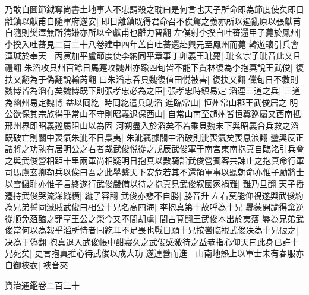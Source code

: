 乃敢自圖節鉞奪尚書土地事人不忠請殺之耽曰是何言也天子所命即為節度使矣即日離鎮以獻甫自隨軍府遂安|{
	即日離鎮既得君命召不俟駕之義亦所以遏亂原以張獻甫自隨則樊澤無所猜嫌亦所以全獻甫也離力智翻}
左僕射李揆自吐蕃還甲子薨於鳳州|{
	李揆入吐蕃見二百二十八卷建中四年盖自吐蕃還赴興元至鳳州而薨}
韓遊瓌引兵會渾瑊於奉天　丙寅加平盧節度使李納同平章事丁卯義王玼薨|{
	玼玄宗子玼音此又且禮翻}
朱滔攻貝州百餘日馬寔攻魏州亦踰四旬皆不能下賈林復為李抱真說王武俊|{
	復扶又翻為于偽翻說輸芮翻}
曰朱滔志呑貝魏復值田悦被害|{
	復抉又翻}
儻旬日不救則魏博皆為滔有矣魏博既下則張孝忠必為之臣|{
	張孝忠時鎮易定}
滔連三道之兵|{
	三道為幽州易定魏博}
益以囘紇|{
	時囘紇遣兵助滔}
進臨常山|{
	恒州常山郡王武俊居之}
明公欲保其宗族得乎常山不守則昭義退保西山|{
	自常山南至趙州皆恒冀廵屬又西南抵邢州界即昭義廵屬阻山以為固}
河朔盡入於滔矣不若乘貝魏未下與昭義合兵救之滔既破亡則關中喪氣朱泚不日梟夷|{
	朱泚竊據關中滔破則泚喪氣矣喪息浪翻}
鑾輿反正諸將之功孰有居明公之右者哉武俊悦從之戊辰武俊軍于南宫東南抱真自臨洺引兵會之與武俊營相距十里兩軍尚相疑明日抱真以數騎詣武俊營賓客共諫止之抱真命行軍司馬盧玄卿勒兵以俟曰吾之此舉繫天下安危若其不還領軍事以聽朝命亦惟子勵將士以雪讎耻亦惟子言終遂行武俊嚴備以待之抱真見武俊叙國家禍難|{
	難乃旦翻}
天子播遷持武俊哭流涕縱横|{
	縱子容翻}
武俊亦悲不自勝|{
	勝音升}
左右莫能仰視遂與武俊約為兄弟誓同滅賊武俊曰相公十兄名高四海|{
	李抱真第十故呼為十兄}
曏蒙開諭得棄逆從順免葅醢之罪享王公之榮今又不間胡虜|{
	間古莧翻王武俊本出於夷落}
辱為兄弟武俊當何以為報乎滔所恃者囘紇耳不足畏也戰日願十兄按轡臨視武俊决為十兄破之|{
	决為于偽翻}
抱真退入武俊帳中酣寢久之武俊感激待之益恭指心仰天曰此身已許十兄死矣|{
	史言抱真推心待武俊以成大功}
遂連營而進　山南地熱上以軍士未有春服亦自御裌衣|{
	裌音夾}


資治通鑑卷二百三十
